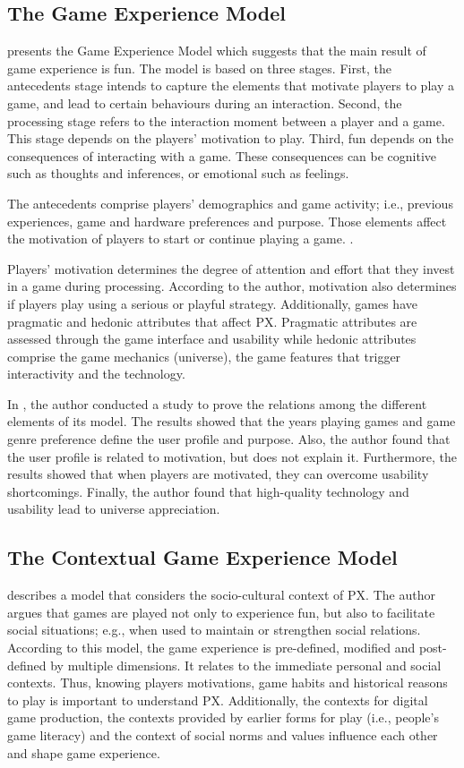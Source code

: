 \subsection{The Game Experience Model}
\textcite{Fernandez2008} presents the Game Experience Model which suggests that the main result of game experience is fun. The model is based on three stages. First, the antecedents stage intends to capture the elements that motivate players to play a game, and lead to certain behaviours during an interaction. Second, the processing stage refers to the interaction moment between a player and a game. This stage depends on the players' motivation to play. Third, fun depends on the consequences of interacting with a game. These consequences can be cognitive such as thoughts and inferences, or emotional such as feelings.

The antecedents comprise players' demographics and game activity; i.e., previous experiences, game and hardware preferences and purpose. Those elements affect the motivation of players to start or continue playing a game. . 

Players' motivation determines the degree of attention and effort that they invest in a game during processing. According to the author, motivation also determines if players play using a serious or playful strategy. Additionally, games have pragmatic and hedonic attributes that affect \ac{PX}. Pragmatic attributes are assessed through the game interface and usability while hedonic attributes comprise the game mechanics (universe), the game features that trigger interactivity and the technology.

In \autocite{Fernandez}, the author conducted a study to prove the relations among the different elements of its model. The results showed that the years playing games and game genre preference define the user profile and purpose. Also, the author found that the user profile is related to motivation, but does not explain it. Furthermore, the results showed that when players are motivated, they can overcome usability shortcomings. Finally, the author found that high-quality technology and usability lead to universe appreciation.

\subsection{The Contextual Game Experience Model}
\textcite{Mayra} describes a model that considers the socio-cultural context of \ac{PX}. The author argues that games are played not only to experience fun, but also to facilitate social situations; e.g., when used to maintain or strengthen social relations. According to this model, the game experience is pre-defined, modified and post-defined by multiple dimensions. It relates to the immediate personal and social contexts. Thus, knowing players motivations, game habits and historical reasons to play is important to understand \ac{PX}. Additionally, the contexts for digital game production, the contexts provided by earlier forms for play (i.e., people's game literacy) and the context of social norms and values influence each other and shape game experience.

